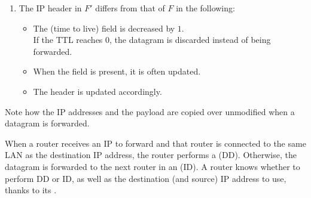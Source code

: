 \begin{enumerate}
\begin{enumerate}[label=\alph*)]
  \item The IP header in $F'$ differs from that of $F$ in the following:
    \begin{itemize}
    \item The  (time to live) field is decreased by $1$.\\
    If the TTL reaches $0$, the datagram is discarded instead of being forwarded.
    \item When the  field is present, it is often updated.
    \item The header  is updated accordingly.\\
    \end{itemize}
  \end{enumerate}
\end{enumerate}

\begin{remark}
 Note how the IP addresses and the payload are copied over unmodified
  when a datagram is forwarded.
\end{remark}




When a router receives an IP  to forward and that router 
is connected to the same LAN as the destination IP address, the router performs a  (DD).
% 
Otherwise, the datagram is forwarded to the next router in an  (ID).
% 
A router knows whether to perform DD or ID, as well as the destination (and source) IP address to use,
thanks to its .


